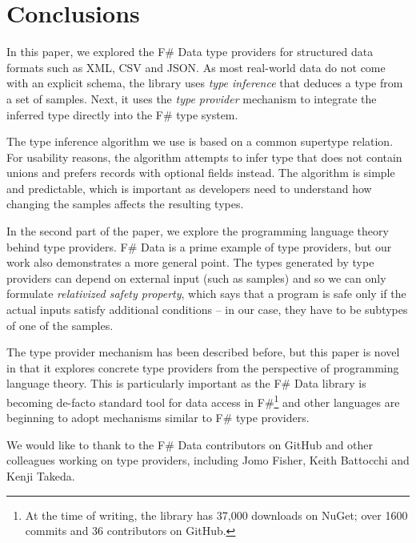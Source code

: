 \documentclass[preprint]{sigplanconf}
\begin{document}
\section{Conclusions}
\label{sec:conclusions}

In this paper, we explored the F\# Data type providers for structured data formats such as XML, CSV and JSON.
As most real-world data do not come with an explicit schema, the library uses \emph{type inference} that
deduces a type from a set of samples. Next, it uses the \emph{type provider} mechanism to integrate the 
inferred type directly into the F\# type system.

The type inference algorithm we use is based on a common supertype relation. For usability reasons, the
algorithm attempts to infer type that does not contain unions and prefers records with optional fields instead.
The algorithm is simple and predictable, which is important as developers need to understand how changing the
samples affects the resulting types.

In the second part of the paper, we explore the programming language theory behind type providers. F\# Data
is a prime example of type providers, but our work also demonstrates a more general point. The types generated
by type providers can depend on external input (such as samples) and so we can only formulate \emph{relativized
safety property}, which says that a program is safe only if the actual inputs satisfy additional conditions --
in our case, they have to be subtypes of one of the samples.

The type provider mechanism has been described before, but this paper is novel in that it explores concrete
type providers from the perspective of programming language theory. This is particularly important as the
F\# Data library is becoming de-facto standard tool for data access in F\#\footnote{At the time of writing, 
the library has 37,000 downloads on NuGet; over 1600 commits and 36 contributors on GitHub.} and other 
languages are beginning to adopt mechanisms similar to F\# type providers.

\acks
We would like to thank to the F\# Data contributors on GitHub and other colleagues working on type providers,
including Jomo Fisher, Keith Battocchi and Kenji Takeda.




\end{document}
